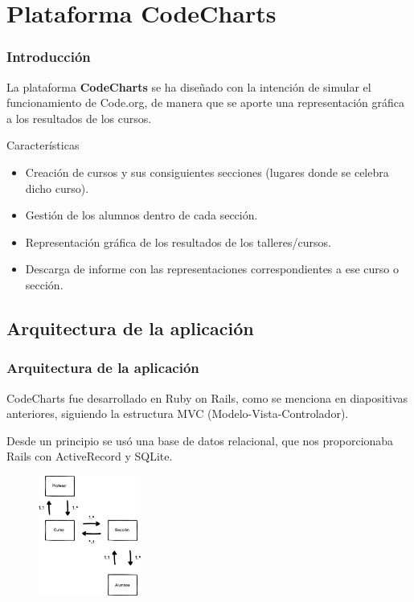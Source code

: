 \documentclass{beamer}
\begin{document}

\section{Plataforma CodeCharts}

\begin{frame}
\frametitle{Introducción}

La plataforma \textbf{CodeCharts} se ha diseñado con la intención de simular el funcionamiento de Code.org, de manera que se aporte una representación gráfica a los resultados
de los cursos.

\begin{block}{Características}
    \begin{itemize}
        \item Creación de cursos y sus consiguientes secciones (lugares donde se celebra dicho curso).
        \item Gestión de los alumnos dentro de cada sección.
        \item Representación gráfica de los resultados de los talleres/cursos.
        \item Descarga de informe con las representaciones correspondientes a ese curso o sección.
    \end{itemize}
\end{block}

\end{frame}

\subsection{Arquitectura de la aplicación}

\begin{frame}
\frametitle{Arquitectura de la aplicación}

CodeCharts fue desarrollado en Ruby on Rails, como se menciona en diapositivas anteriores, siguiendo la estructura MVC (Modelo-Vista-Controlador). 

Desde un principio se usó una base de datos relacional, que nos proporcionaba Rails con ActiveRecord y SQLite.

\begin{figure}
    \includegraphics[width=0.3\textwidth]{img/base_de_datos.eps}
\end{figure}

\end{frame}
\end{document}
